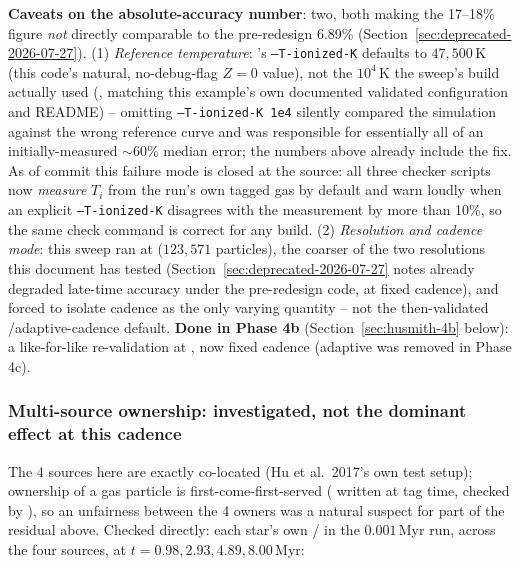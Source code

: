 \textbf{Caveats on the absolute-accuracy number}: two, both making the
17--18\% figure \emph{not} directly comparable to the pre-redesign
6.89\% (Section~\ref{sec:deprecated-2026-07-27}). (1) \emph{Reference
temperature}: 's
\texttt{--T-ionized-K}
defaults to $47{,}500\,$K (this code's natural, no-debug-flag $Z=0$
value), not the $10^4\,$K the sweep's build actually used
(,
matching this example's own documented validated configuration and
README) -- omitting \texttt{--T-ionized-K 1e4} silently compared the
simulation against the wrong reference curve and was responsible for
essentially all of an initially-measured $\sim$60\% median error; the
numbers above already include the fix. As of commit 
this failure mode is closed at the source: all three checker scripts
now \emph{measure} $T_i$ from the run's own tagged gas by default and
warn loudly when an explicit \texttt{--T-ionized-K} disagrees with the
measurement by more than 10\%, so the same check command is correct for
any build. (2) \emph{Resolution and
cadence mode}: this sweep ran at  ($123{,}571$
particles), the coarser of the two resolutions this document has
tested (Section~\ref{sec:deprecated-2026-07-27} notes 
already degraded late-time accuracy under the pre-redesign code, at
fixed cadence), and forced  to
isolate cadence as the only varying quantity -- not the then-validated
/adaptive-cadence default. \textbf{Done in Phase 4b}
(Section~\ref{sec:husmith-4b} below): a like-for-like re-validation at
, now fixed cadence (adaptive was removed in Phase 4c).

\subsubsection{Multi-source ownership: investigated, not the dominant
effect at this cadence}
\label{sec:husmith-ownership}

The 4 sources here are exactly co-located (Hu et al.\ 2017's own test
setup); ownership of a gas particle is first-come-first-served
( written at tag time, checked by
), so an
unfairness between the 4 owners was a natural suspect for part of the
residual above. Checked directly: each star's own
/ in the $0.001\,$Myr run,
across the four sources, at $t=0.98,2.93,4.89,8.00\,$Myr:

